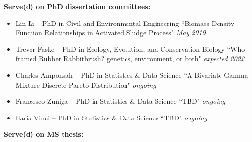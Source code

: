 \documentclass[paper=a4,fontsize=11pt]{scrartcl} %
\newcommand{\ThesisEntry}[5]{
		\noindent #1 -- #2 #3 ``#4" \textit{#5}}
\begin{document}
\noindent \textbf{Serve(d) on PhD dissertation committees:}
  
\begin{itemize}[noitemsep]

        \item \ThesisEntry{Lin Li}{PhD in Civil and Environmental Engineering}{}{Biomass Density-Function Relationships in Activated Sludge Process}{May 2019}

\item \ThesisEntry{Trevor Faske}{PhD in Ecology, Evolution, and Conservation Biology}{}{Who framed Rubber Rabbitbrush? genetics, environment, or both}{expected 2022}
          
\item \ThesisEntry{Charles Amponsah}{PhD in Statistics \& Data Science}{}{A Bivariate Gamma Mixture Discrete Pareto Distribution}{ongoing}
    

\item \ThesisEntry{Francesco Zuniga}{PhD in Statistics \& Data Science}{}{TBD}{ongoing}

  \item \ThesisEntry{Ilaria Vinci}{PhD in Statistics \& Data Science}{}{TBD}{ongoing}

  \end{itemize}
  
  \noindent \textbf{Serve(d) on MS thesis:}
\end{document}
